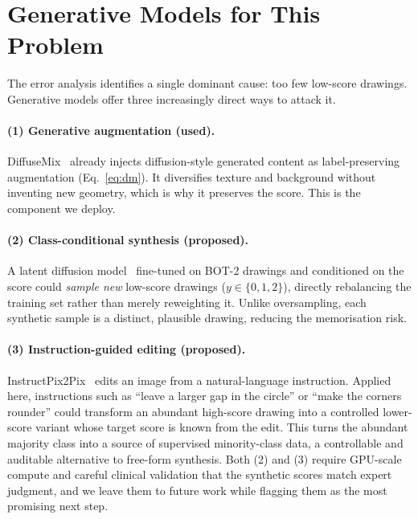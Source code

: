 \documentclass[10pt,twocolumn,letterpaper]{article}
\begin{document}
\section{Generative Models for This Problem}
\label{sec:gen}

The error analysis identifies a single dominant cause: too few low-score
drawings. Generative models offer three increasingly direct ways to attack it.

\paragraph{(1) Generative augmentation (used).}
DiffuseMix~\cite{diffusemix} already injects diffusion-style generated content
as label-preserving augmentation (Eq.~\ref{eq:dm}). It diversifies texture and
background without inventing new geometry, which is why it preserves the score.
This is the component we deploy.

\paragraph{(2) Class-conditional synthesis (proposed).}
A latent diffusion model~\cite{stablediffusion} fine-tuned on BOT-2 drawings
and conditioned on the score could \emph{sample new} low-score drawings
($y\!\in\!\{0,1,2\}$), directly rebalancing the training set rather than merely
reweighting it. Unlike oversampling, each synthetic sample is a distinct,
plausible drawing, reducing the memorisation risk.

\paragraph{(3) Instruction-guided editing (proposed).}
InstructPix2Pix~\cite{ip2p} edits an image from a natural-language instruction.
Applied here, instructions such as ``leave a larger gap in the circle'' or
``make the corners rounder'' could transform an abundant high-score drawing
into a controlled lower-score variant whose target score is known from the
edit. This turns the abundant majority class into a source of supervised
minority-class data, a controllable and auditable alternative to free-form
synthesis. Both (2) and (3) require GPU-scale compute and careful clinical
validation that the synthetic scores match expert judgment, and we leave them
to future work while flagging them as the most promising next step.

\end{document}
